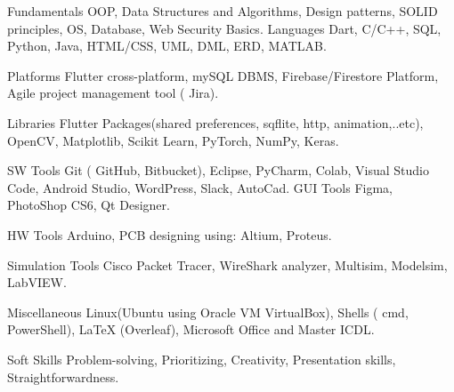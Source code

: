 

\begin{cvskills}

  \cvskill
    {Fundamentals} %
    {OOP, Data Structures and Algorithms, Design patterns, SOLID principles, OS, Database, Web Security Basics.} %
\cvskill
{Languages} %
{ Dart, C/C++, SQL, Python, Java, HTML/CSS, UML, DML, ERD, MATLAB.} %

\cvskill
{Platforms} %
{ Flutter cross-platform, mySQL DBMS, Firebase/Firestore Platform, Agile project management tool ( Jira). } %

\cvskill
{Libraries} %
{Flutter Packages(shared preferences, sqflite, http, animation,..etc), OpenCV, Matplotlib, Scikit Learn, PyTorch, NumPy, Keras.} %

\cvskill
{SW Tools} %
{Git ( GitHub, Bitbucket), Eclipse, PyCharm, Colab, Visual Studio Code, Android Studio, WordPress, Slack, AutoCad.} %
\cvskill
{GUI Tools} %
{Figma, PhotoShop CS6, Qt Designer.} %

\cvskill
{HW Tools} %
{Arduino, PCB designing using: Altium, Proteus.} %

\cvskill
{Simulation Tools} %
{Cisco Packet Tracer, WireShark analyzer, Multisim, Modelsim, LabVIEW.} %

  \cvskill
    {Miscellaneous} %
    {Linux(Ubuntu using Oracle VM VirtualBox), Shells ( cmd, PowerShell), LaTeX (Overleaf), Microsoft Office and Master ICDL.} %

  \cvskill
    {Soft Skills} %
    {Problem-solving, Prioritizing, Creativity, Presentation skills, Straightforwardness.} %

\end{cvskills}
